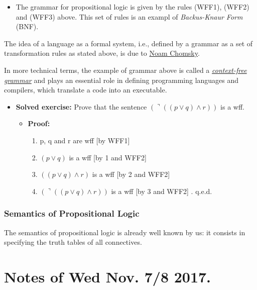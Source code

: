 \begin{itemize}
\tightlist
\item
  The grammar for propositional logic is given by the rules (WFF1),
  (WFF2) and (WFF3) above. This set of rules is an exampl of
  \emph{Backus-Knaur Form} (BNF).
\end{itemize}

The idea of a language as a formal system, i.e., defined by a grammar as
a set of transformation rules as stated above, is due to
\href{https://en.wikipedia.org/wiki/Noam_Chomsky}{Noam Chomsky}.

In more technical terms, the example of grammar above is called a
\href{https://en.wikipedia.org/wiki/Context-free_grammar}{\emph{context-free
grammar}} and plays an essential role in defining programming languages
and compilers, which translate a code into an executable.

\begin{itemize}
\tightlist
\item
  \textbf{Solved exercise:} Prove that the sentence
  \((\urcorner ((p\vee q)\wedge r))\) is a wff.

  \begin{itemize}
  \tightlist
  \item
    \textbf{Proof:}

    \begin{enumerate}
    \def\labelenumi{\arabic{enumi}.}
    \tightlist
    \item
      p, q and r are wff {[}by WFF1{]}
    \item
      \((p\vee q)\) is a wff {[}by 1 and WFF2{]}
    \item
      \(((p\vee q)\wedge r)\) is a wff {[}by 2 and WFF2{]}
    \item
      \((\urcorner ((p\vee q)\wedge r))\) is a wff {[}by 3 and WFF2{]} .
      q.e.d.
    \end{enumerate}
  \end{itemize}
\end{itemize}

\subsubsection{Semantics of Propositional
Logic}\label{semantics-of-propositional-logic}

The semantics of propositional logic is already well known by us: it
consists in specifying the truth tables of all connectives.

\section{Notes of Wed Nov. 7/8 2017.}\label{notes-of-wed-nov.-78-2017.}

